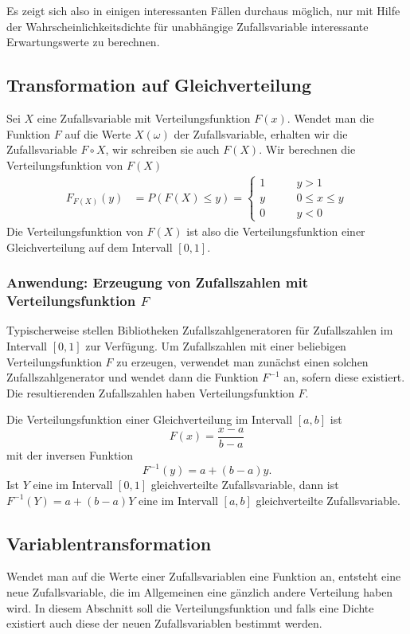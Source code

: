 Es zeigt sich also in einigen interessanten Fällen durchaus möglich, nur mit
Hilfe der Wahrscheinlichkeitsdichte für unabhängige
Zufallsvariable interessante Erwartungswerte zu berechnen.

\subsection{Transformation auf Gleichverteilung}
Sei $X$ eine Zufallsvariable mit Verteilungsfunktion $F(x)$.
Wendet man die Funktion $F$ auf die Werte $X(\omega)$ der Zufallsvariable,
erhalten wir die Zufallsvariable $F\circ X$, wir schreiben sie auch
$F(X)$.
Wir berechnen die Verteilungsfunktion von $F(X)$
\begin{align*}
F_{F(X)}(y)
&=
P(F(X)\le y)
=
\begin{cases}
1&\qquad y > 1\\
y&\qquad 0\le x\le y\\
0&\qquad y < 0
\end{cases}
\end{align*}
Die Verteilungsfunktion von $F(X)$ ist also die Verteilungsfunktion einer
Gleichverteilung auf dem Intervall $[0,1]$.

\subsubsection{Anwendung: Erzeugung von Zufallszahlen mit Verteilungsfunktion \texorpdfstring{$F$}{F}}
Typischerweise stellen Bibliotheken Zufallszahlgeneratoren für Zufallszahlen
im Intervall $[0,1]$ zur Verfügung.
Um Zufallszahlen mit einer beliebigen Verteilungsfunktion $F$ zu erzeugen,
verwendet man zunächst einen solchen Zufallszahlgenerator und wendet dann die
Funktion $F^{-1}$ an, sofern diese existiert.
Die resultierenden Zufallszahlen haben Verteilungsfunktion $F$.

\begin{beispiel}
Die Verteilungsfunktion einer Gleichverteilung im Intervall $[a,b]$ ist
\[
F(x)=\frac{x-a}{b-a}
\]
mit der inversen Funktion
\[
F^{-1}(y)=a+(b-a)y.
\]
Ist $Y$ eine im Intervall $[0,1]$ gleichverteilte Zufallsvariable, dann ist
$F^{-1}(Y)=a+(b-a)Y$ eine im Intervall $[a,b]$ gleichverteilte Zufallsvariable.
\end{beispiel}

\subsection{Variablentransformation}
Wendet man auf die Werte einer Zufallsvariablen eine Funktion an, entsteht
eine neue Zufallsvariable, die im Allgemeinen eine gänzlich andere Verteilung
haben wird.
In diesem Abschnitt soll die Verteilungsfunktion und falls
eine Dichte existiert auch diese der neuen Zufallsvariablen bestimmt werden.

